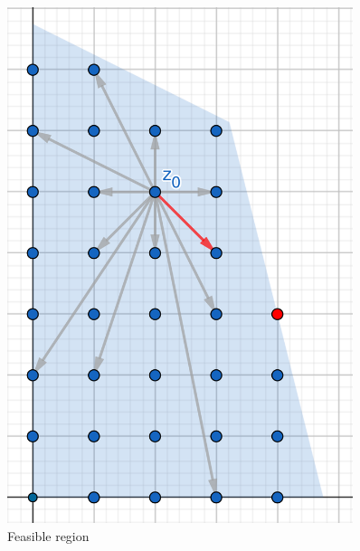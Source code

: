 \vspace{10pt}
\begin{figure}[h]
\centering
\begin{minipage}[b]{0.45\textwidth}
    \centering
    \includegraphics[width=0.9\textwidth]{images/IP(1).png}
    \caption{Feasible region}
\end{minipage}
\hfill
\begin{minipage}[b]{0.45\textwidth}
    \centering

\end{minipage}
\end{figure}
